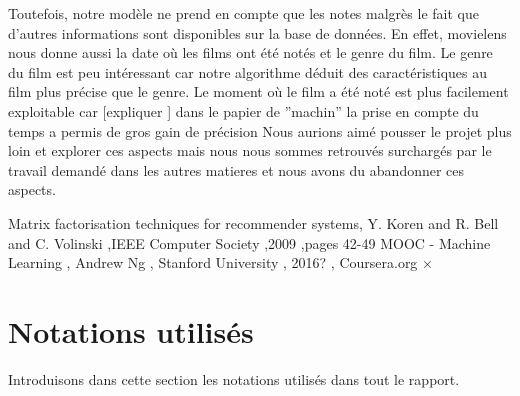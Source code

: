 \documentclass[a4paper,10pt]{article}
\begin{document}
Toutefois, notre modèle ne prend en compte que les notes malgrès le fait que d'autres informations sont disponibles sur la base de données.
En effet, movielens nous donne aussi la date où les films ont été notés et le genre du film.
Le genre du film est peu intéressant car notre algorithme déduit des caractéristiques au film plus précise que le genre.%
Le moment où le film a été noté est plus facilement exploitable car [expliquer ] dans le papier de ''machin'' la prise en compte  du temps a
permis de gros gain de précision%
Nous aurions aimé pousser le projet plus loin et explorer ces aspects 
mais nous nous sommes retrouvés surchargés par le travail demandé dans les autres matieres et nous avons du abandonner ces aspects.



\begin{thebibliography}{99}

 Matrix factorisation techniques for recommender systems, Y. Koren and R. Bell and C. Volinski ,IEEE Computer Society ,2009 ,pages 42-49
 MOOC - Machine Learning , Andrew Ng , Stanford University , 2016? , Coursera.org
 ×
\end{thebibliography}

\newpage





\appendix
\section{Notations utilisés}
\label{notations}

Introduisons dans cette section les notations utilisés dans tout le rapport.\\ 
\end{document}
